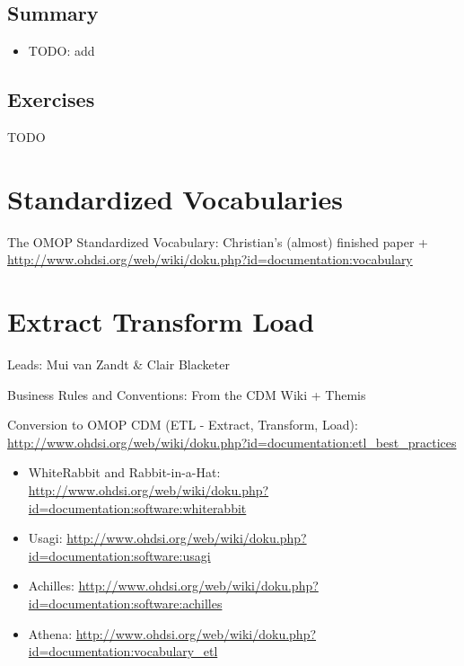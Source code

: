 \documentclass[11pt]{book}
\providecommand{\tightlist}{%
  \setlength{\itemsep}{0pt}\setlength{\parskip}{0pt}}
\let\BeginKnitrBlock\begin \let\EndKnitrBlock\end
\begin{document}
\section{Summary}\label{summary}

\BeginKnitrBlock{rmdsummary}
\begin{itemize}
\tightlist
\item
  TODO: add
\end{itemize}
\EndKnitrBlock{rmdsummary}

\section{Exercises}\label{exercises}

TODO

\chapter{Standardized Vocabularies}\label{StandardizedVocabularies}

The OMOP Standardized Vocabulary: Christian's (almost) finished paper +
\url{http://www.ohdsi.org/web/wiki/doku.php?id=documentation:vocabulary}

\chapter{Extract Transform Load}\label{ExtractTransformLoad}

Leads: Mui van Zandt \& Clair Blacketer

Business Rules and Conventions: From the CDM Wiki + Themis

Conversion to OMOP CDM (ETL - Extract, Transform, Load):
\url{http://www.ohdsi.org/web/wiki/doku.php?id=documentation:etl_best_practices}

\begin{itemize}
\tightlist
\item
  WhiteRabbit and Rabbit-in-a-Hat:
  \url{http://www.ohdsi.org/web/wiki/doku.php?id=documentation:software:whiterabbit}
\item
  Usagi:
  \url{http://www.ohdsi.org/web/wiki/doku.php?id=documentation:software:usagi}
\item
  Achilles:
  \url{http://www.ohdsi.org/web/wiki/doku.php?id=documentation:software:achilles}
\item
  Athena:
  \url{http://www.ohdsi.org/web/wiki/doku.php?id=documentation:vocabulary_etl}
\end{itemize}
\end{document}
